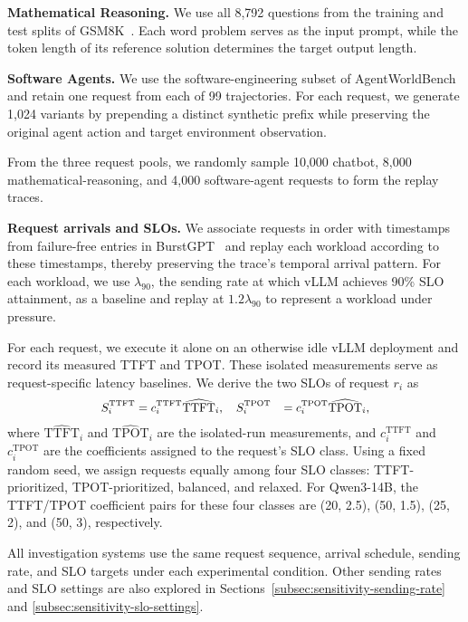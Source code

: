 \textbf{Mathematical Reasoning.}
We use all 8,792 questions from the training and test splits of GSM8K~\cite{cobbe2021gsm8k}.
Each word problem serves as the input prompt, while the token length of its reference solution determines the target output length.

\textbf{Software Agents.}
We use the software-engineering subset of AgentWorldBench~\cite{zuo2026agentworld} and retain one request from each of 99 trajectories.
For each request, we generate 1,024 variants by prepending a distinct synthetic prefix while preserving the original agent action and target environment observation.

From the three request pools, we randomly sample 10,000 chatbot, 8,000 mathematical-reasoning, and 4,000 software-agent requests to form the replay traces.

\textbf{Request arrivals and SLOs.}
We associate requests in order with timestamps from failure-free entries in BurstGPT~\cite{wang2025burstgpt} and replay each workload according to these timestamps, thereby preserving the trace's temporal arrival pattern.
For each workload, we use $\lambda_{90}$, the sending rate at which vLLM achieves 90\% SLO attainment, as a baseline and replay at $1.2\lambda_{90}$ to represent a workload under pressure.

For each request, we execute it alone on an otherwise idle vLLM deployment and record its measured TTFT and TPOT.
These isolated measurements serve as request-specific latency baselines.
We derive the two SLOs of request $r_i$ as
\begin{equation}
  \small
  \begin{aligned}
    S_i^{\mathrm{TTFT}} &= c_i^{\mathrm{TTFT}}
    \widehat{\mathrm{TTFT}}_i, \quad
    S_i^{\mathrm{TPOT}} &= c_i^{\mathrm{TPOT}}
    \widehat{\mathrm{TPOT}}_i,
  \end{aligned}
  \label{eq:slo-generation}
\end{equation}
where $\widehat{\mathrm{TTFT}}_i$ and $\widehat{\mathrm{TPOT}}_i$ are the isolated-run measurements, and $c_i^{\mathrm{TTFT}}$ and $c_i^{\mathrm{TPOT}}$ are the coefficients assigned to the request's SLO class.
Using a fixed random seed, we assign requests equally among four SLO classes: TTFT-prioritized, TPOT-prioritized, balanced, and relaxed.
For Qwen3-14B, the TTFT/TPOT coefficient pairs for these four classes are (20, 2.5), (50, 1.5), (25, 2), and (50, 3), respectively.

All investigation systems use the same request sequence, arrival schedule, sending rate, and SLO targets under each experimental condition.
Other sending rates and SLO settings are also explored in Sections~\ref{subsec:sensitivity-sending-rate} and \ref{subsec:sensitivity-slo-settings}.

